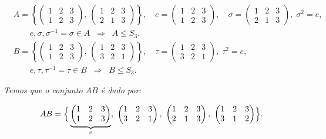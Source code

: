 \documentclass[16pt,openany]{book}
\theoremstyle{definition}
\begin{document}
\[
\begin{aligned}
& A = \left\{
  \begin{pmatrix}
    1 & 2 & 3 \\[4pt]
    1 & 2 & 3
  \end{pmatrix},\,
  \begin{pmatrix}
    1 & 2 & 3 \\[4pt]
    2 & 1 & 3
  \end{pmatrix}
\right\}, 
\quad
e = \begin{pmatrix}
1 & 2 & 3 \\[4pt]
1 & 2 & 3
\end{pmatrix}, 
\quad
\sigma = \begin{pmatrix}
1 & 2 & 3 \\[4pt]
2 & 1 & 3
\end{pmatrix}, 
\; \sigma^2 = e, 
\\
&\qquad e,\sigma,\sigma^{-1}=\sigma \in A 
\;\;\Longrightarrow\;\; A \le S_3. 
\\
& B = \left\{
  \begin{pmatrix}
    1 & 2 & 3 \\[4pt]
    1 & 2 & 3
  \end{pmatrix},\,
  \begin{pmatrix}
    1 & 2 & 3 \\[4pt]
    3 & 2 & 1
  \end{pmatrix}
\right\}, 
\quad
\tau = \begin{pmatrix}
1 & 2 & 3 \\[4pt]
3 & 2 & 1
\end{pmatrix}, 
\; \tau^2 = e, 
\\
&\qquad e,\tau,\tau^{-1}=\tau \in B 
\;\;\Longrightarrow\;\; B \le S_3.
\end{aligned}
\]

\textit{Temos que o conjunto $AB$ é dado por:}

\[
AB = \Bigl\{\,
  \underbrace{\begin{pmatrix}1&2&3\\1&2&3\end{pmatrix}}_{e},\ 
  \begin{pmatrix}1&2&3\\3&2&1\end{pmatrix},\ 
  \begin{pmatrix}1&2&3\\2&1&3\end{pmatrix},\ 
  \begin{pmatrix}1&2&3\\3&1&2\end{pmatrix}
\Bigr\}.
\]
\end{document}
